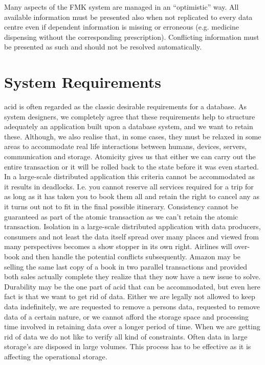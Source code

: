 \documentclass[english]{article}
\begin{document}
Many aspects of the FMK system are managed in an ``optimistic'' way. All available information must be presented also when not replicated to
every data centre even if dependent information is missing or erroneous (e.g. medicine dispensing without the corresponding
prescription). Conflicting information must be presented as such and should not be resolved automatically. %


\section{System Requirements}

\gls{acid} is often regarded as the classic desirable requirements for a database. As system designers, we completely agree that these requirements help to structure adequately an application built upon a database system, and we want to retain these.  Although, we also realise that, in some cases, they must be relaxed in some areas to accommodate real life interactions between humans, devices, servers, communication and storage. Atomicity gives us that either we can carry out the entire transaction or it will be rolled back to the state before it was even
started. In a large-scale distributed application this criteria cannot be accommodated as it results in deadlocks. I.e. you cannot reserve
all services required for a trip for as long as it has taken you to book them all and retain the right to cancel any as it turns out not
to fit in the final possible itinerary.  Consistency cannot be guaranteed as part of the atomic transaction as we can't retain the atomic transaction.  Isolation in a large-scale distributed application with data producers, consumers and not least the data itself spread over many places and viewed from many perspectives becomes a show stopper in its own right.  Airlines will over-book and then handle the potential conflicts subsequently.  Amazon may be selling the same last copy of a book in two parallel transactions and provided both sales actually complete they realize that they now have a new issue to solve. Durability may be the one part of \gls{acid} that can be accommodated, but even here fact is that we want to get rid of data. Either we are legally not allowed to keep data indefinitely, we are requested to remove a persons data, requested to remove data of a
certain nature, or we cannot afford the storage space and processing time involved in retaining data over a longer period of time. When we
are getting rid of data we do not like to verify all kind of constraints. Often data in large storage's are disposed in large volumes. This process has to be effective as it is affecting the operational storage.
\end{document}
